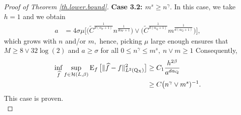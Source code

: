 \documentclass[10pt]{article}
\newcommand{\mH}{\mathcal{H}}
\newcommand{\E}{\operatorname{E}}
\renewcommand{\P}{\operatorname{P}}
\newcommand{\Q}{\operatorname{Q}}
\newcommand{\wh}{\widehat}
\newcommand{\sX}{\mathrm{X}}
\begin{document}
\begin{proof}[Proof of Theorem \ref{th.lower.bound}]
    \noindent\textbf{Case 3.2: $m^s \geq n^\gamma.$} In this case, we take $h = 1$ and we obtain
    \begin{align*}
        a &= 4\sigma\mu\bigg[\Big(\tilde C^{\tfrac{1}{d(\alpha_{\P} + 1)}}n^{\tfrac{1}{d\alpha_{\P} + 1}}\Big)\vee \Big(\tilde C^{\tfrac{1}{d(\alpha_{\Q} + 1)}}m^{\tfrac{1}{d(\alpha_{\Q} + 1)}}\Big)\bigg],
    \end{align*}
    which grows with $n$ and/or $m,$ hence, picking $\mu$ large enough ensures that$M \geq 8 \vee 32\log(2)$ and $a \geq \sigma$ for all $0 \leq n^\gamma \leq m^s, \ n \vee m \geq 1$ Consequently, 
    \begin{align*}
        \inf_{\wh f} \sup_{f \in \mH(L, \beta)}\E_{f}\big[\|\wh f - f\|_{L^2(\Q\mathstrut_{\!\sX})}^2\big] &\geq C_1\frac{h^{2\beta}}{a^{d\alpha_{\Q}}}\\
        &\geq C \big(n^{\gamma}\vee m^{s})^{-1}.
    \end{align*}
    This case is proven.\\


\end{proof}
\end{document}
